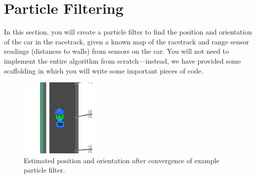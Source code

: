 \documentclass[a4paper]{article}
\theoremstyle{definition}
\theoremstyle{plain}
\begin{document}




\section{Particle Filtering}

In this section, you will create a particle filter to find the position and orientation of the car in the racetrack, given a known map of the racetrack and range sensor readings (distances to walls) from sensors on the car. You will not need to implement the entire algorithm from scratch---instead, we have provided some scaffolding in which you will write some important pieces of code.

\begin{figure}[h!]
    \centering
    \includegraphics[scale=0.7]{images/pf_loclalized_crop.png}
    \caption{Estimated position and orientation after convergence of example particle filter.}
    \label{fig:pf_localized_crop}
\end{figure}
\end{document}
